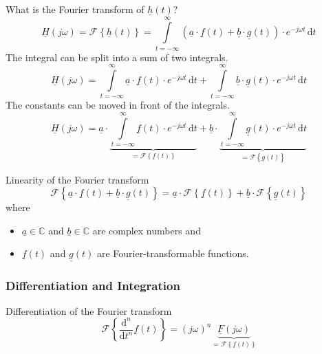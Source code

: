 \begin{refsection}
What is the Fourier transform of $\underline{h}(t)$?
\begin{equation}
	\underline{H}(j \omega) = \mathcal{F} \left\{\underline{h}(t)\right\} = \int\limits_{t = -\infty}^{\infty} \left(\underline{a} \cdot \underline{f}(t) + \underline{b} \cdot \underline{g}(t)\right) \cdot e^{-j \omega t} \, \mathrm{d} t
\end{equation}
The integral can be split into a sum of two integrals.
\begin{equation}
	\underline{H}(j \omega) = \int\limits_{t = -\infty}^{\infty} \underline{a} \cdot \underline{f}(t) \cdot e^{-j \omega t} \, \mathrm{d} t + \int\limits_{t = -\infty}^{\infty} \underline{b} \cdot \underline{g}(t) \cdot e^{-j \omega t} \, \mathrm{d} t
\end{equation}
The constants can be moved in front of the integrals.
\begin{equation}
	\underline{H}(j \omega) = \underline{a} \cdot \underbrace{\int\limits_{t = -\infty}^{\infty} \underline{f}(t) \cdot e^{-j \omega t} \, \mathrm{d} t}_{= \mathcal{F}\left\{\underline{f}(t)\right\}} + \underline{b} \cdot \underbrace{\int\limits_{t = -\infty}^{\infty} \underline{g}(t) \cdot e^{-j \omega t} \, \mathrm{d} t}_{= \mathcal{F}\left\{\underline{g}(t)\right\}}
\end{equation}

\begin{definition}{Linearity of the Fourier transform}
	\begin{equation}
		\mathcal{F}\left\{\underline{a} \cdot \underline{f}(t) + \underline{b} \cdot \underline{g}(t)\right\} = \underline{a} \cdot \mathcal{F}\left\{\underline{f}(t)\right\} + \underline{b} \cdot \mathcal{F}\left\{\underline{g}(t)\right\}
		\label{eq:ch02:op_lin}
	\end{equation}
	where
	\begin{itemize}
		\item $\underline{a} \in \mathbb{C}$ and $\underline{b} \in \mathbb{C}$ are complex numbers and
		\item $\underline{f}(t)$ and $\underline{g}(t)$ are Fourier-transformable functions.
	\end{itemize}
\end{definition}

\subsubsection{Differentiation and Integration}

\begin{definition}{Differentiation of the Fourier transform}
	\begin{equation}
		\mathcal{F}\left\{\frac{\mathrm{d}^n}{\mathrm{d} t^n} \underline{f}(t)\right\} = \left(j \omega\right)^n \underbrace{\underline{F} \left(j \omega\right)}_{= \mathcal{F}\left\{\underline{f}(t)\right\}}
		\label{eq:ch02:op_diff}
	\end{equation}
\end{definition}


\end{refsection}

